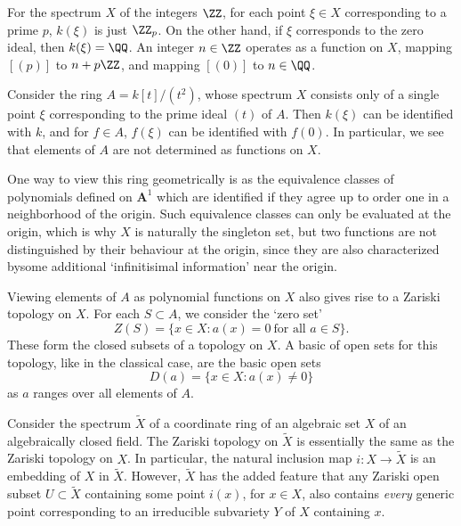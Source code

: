 \begin{example}
    For the spectrum $X$ of the integers $\ZZ$, for each point $\xi \in X$ corresponding to a prime $p$, $k(\xi)$ is just $\ZZ_p$. On the other hand, if $\xi$ corresponds to the zero ideal, then $k(\xi) = \QQ$. An integer $n \in \ZZ$ operates as a function on $X$, mapping $[(p)]$ to $n + p \ZZ$, and mapping $[(0)]$ to $n \in \QQ$.
\end{example}

\begin{example}
    Consider the ring $A = k[t]/(t^2)$, whose spectrum $X$ consists only of a single point $\xi$ corresponding to the prime ideal $(t)$ of $A$. Then $k(\xi)$ can be identified with $k$, and for $f \in A$, $f(\xi)$ can be identified with $f(0)$. In particular, we see that elements of $A$ are not determined as functions on $X$.

    One way to view this ring geometrically is as the equivalence classes of polynomials defined on $\mathbf{A}^1$ which are identified if they agree up to order one in a neighborhood of the origin. Such equivalence classes can only be evaluated at the origin, which is why $X$ is naturally the singleton set, but two functions are not distinguished by their behaviour at the origin, since they are also characterized bysome additional `infinitisimal information' near the origin.
\end{example}

Viewing elements of $A$ as polynomial functions on $X$ also gives rise to a Zariski topology on $X$. For each $S \subset A$, we consider the `zero set'
%
\[ Z(S) = \{ x \in X: a(x) = 0\ \text{for all $a \in S$} \}. \]
%
These form the closed subsets of a topology on $X$. A basic of open sets for this topology, like in the classical case, are the basic open sets
%
\[ D(a) = \{ x \in X: a(x) \neq 0 \} \]
%
as $a$ ranges over all elements of $A$.

\begin{example}
    Consider the spectrum $\tilde{X}$ of a coordinate ring of an algebraic set $X$ of an algebraically closed field. The Zariski topology on $\tilde{X}$ is essentially the same as the Zariski topology on $X$. In particular, the natural inclusion map $i: X \to \tilde{X}$ is an embedding of $X$ in $\tilde{X}$. However, $\tilde{X}$ has the added feature that any Zariski open subset $U \subset \tilde{X}$ containing some point $i(x)$, for $x \in X$, also contains \emph{every} generic point corresponding to an irreducible subvariety $Y$ of $X$ containing $x$.
\end{example}

